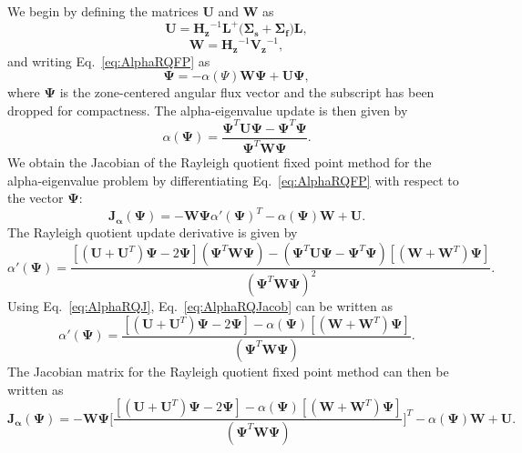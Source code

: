  We begin by defining the matrices $\mathbf{U}$ and $\mathbf{W}$ as
\begin{equation}
	\mathbf{U} = \mathbf{H_{z}}^{-1} \mathbf{L}^{+} \big ( \mathbf{\Sigma_{s}} + \mathbf{\Sigma_{f}} ) \mathbf{L},
\end{equation} 
\begin{equation}
	\mathbf{W} = \mathbf{H_{z}}^{-1} \mathbf{V_{z}}^{-1},
\end{equation}
and writing Eq.~\ref{eq:AlphaRQFP} as
\begin{equation}
	\mathbf{\Psi} = -\alpha(\Psi) \mathbf{W} \mathbf{\Psi} + \mathbf{U} \mathbf{\Psi},
\end{equation}
where $\mathbf{\Psi}$ is the zone-centered angular flux vector and the subscript has been dropped for compactness.
The alpha-eigenvalue update is then given by
\begin{equation}
	\alpha(\mathbf{\Psi}) =  \frac{\mathbf{\Psi}^{T} \mathbf{U} \mathbf{\Psi} - \mathbf{\Psi}^{T} \mathbf{\Psi}}{\mathbf{\Psi}^{T} \mathbf{W} \mathbf{\Psi}}.
	\label{eq:AlphaRQJ}
\end{equation}
We obtain the Jacobian of the Rayleigh quotient fixed point method for the alpha-eigenvalue problem by differentiating Eq.~\ref{eq:AlphaRQFP} with respect to the vector $\mathbf{\Psi}$:
\begin{equation}
	\mathbf{J_{\alpha}}(\mathbf{\Psi}) = -\mathbf{W} \mathbf{\Psi} \alpha'(\mathbf{\Psi})^{T} - \alpha(\mathbf{\Psi}) \mathbf{W} + \mathbf{U}.
\end{equation}
The Rayleigh quotient update derivative is given by
\begin{equation}
	\alpha'(\mathbf{\Psi}) = \frac{[(\mathbf{U}+\mathbf{U}^{T})\mathbf{\Psi} - 2\mathbf{\Psi}](\mathbf{\Psi}^{T} \mathbf{W} \mathbf{\Psi}) - (\mathbf{\Psi}^{T} \mathbf{U} \mathbf{\Psi} - \mathbf{\Psi}^{T} \mathbf{\Psi})[(\mathbf{W} + \mathbf{W}^{T})\mathbf{\Psi}]}{(\mathbf{\Psi}^{T} \mathbf{W} \mathbf{\Psi})^{2}}.
	\label{eq:AlphaRQJacob}
\end{equation}
Using Eq.~\ref{eq:AlphaRQJ}, Eq.~\ref{eq:AlphaRQJacob} can be written as
\begin{equation}
	\alpha'(\mathbf{\Psi}) = \frac{[(\mathbf{U}+\mathbf{U}^{T})\mathbf{\Psi} - 2\mathbf{\Psi}] - \alpha(\mathbf{\Psi})[(\mathbf{W} + \mathbf{W}^{T})\mathbf{\Psi}]}{(\mathbf{\Psi}^{T} \mathbf{W} \mathbf{\Psi})}.
	\label{eq:SimAlphaRQ}
\end{equation}
The Jacobian matrix for the Rayleigh quotient fixed point method can then be written as
\begin{equation}
	\mathbf{J_{\alpha}}(\mathbf{\Psi}) = -\mathbf{W} \mathbf{\Psi} \bigg [ \frac{[(\mathbf{U}+\mathbf{U}^{T})\mathbf{\Psi} - 2\mathbf{\Psi}] - \alpha(\mathbf{\Psi})[(\mathbf{W} + \mathbf{W}^{T})\mathbf{\Psi}]}{(\mathbf{\Psi}^{T} \mathbf{W} \mathbf{\Psi})} \bigg ]^{T} - \alpha(\mathbf{\Psi}) \mathbf{W} + \mathbf{U}.
\end{equation}

